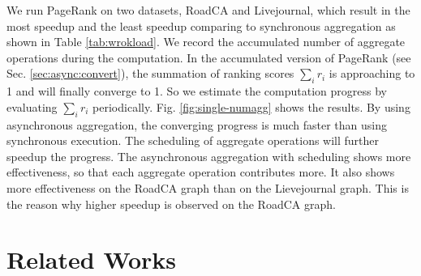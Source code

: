  We run PageRank on two datasets, RoadCA and Livejournal, which result in the most speedup and the least speedup comparing to synchronous aggregation as shown in Table \ref{tab:wrokload}. We record the accumulated number of aggregate operations during the computation. In the accumulated version of PageRank (see Sec. \ref{sec:async:convert}), the summation of ranking scores $\sum_i{r_i}$ is approaching to 1 and will finally converge to 1. So we estimate the computation progress by evaluating $\sum_i{r_i}$ periodically. Fig. \ref{fig:single-numagg} shows the results. By using asynchronous aggregation, the converging progress is much faster than using synchronous execution. The scheduling of aggregate operations will further speedup the progress. The asynchronous aggregation with scheduling shows more effectiveness, so that each aggregate operation contributes more. It also shows more effectiveness on the RoadCA graph than on the Lievejournal graph. This is the reason why higher speedup is observed on the RoadCA graph.

\section{Related Works}
\label{sec:related}




